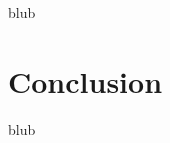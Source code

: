 \label{SectionLiteratureReviewSRQ3}

blub





\section{Conclusion}

\label{SectionLiteratureReviewConclusion}

blub

